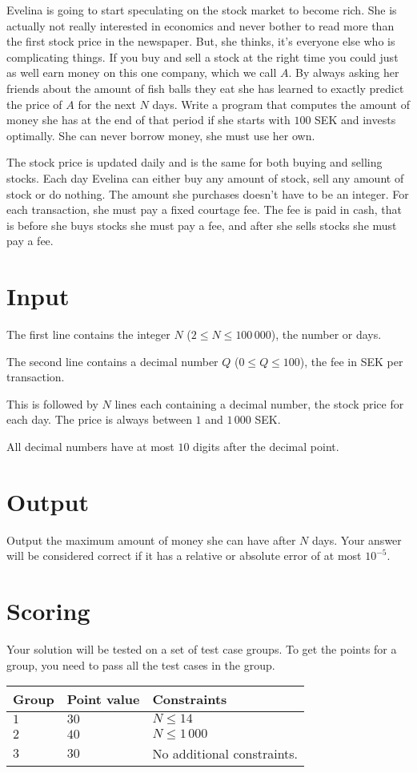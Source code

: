 Evelina is going to start speculating on the stock market to become rich.
She is actually not really interested in economics and never bother to read more than the first stock price in the newspaper.
But, she thinks, it's everyone else who is complicating things.
If you buy and sell a stock at the right time you could just as well earn money on this one company, which we call $A$.
By always asking her friends about the amount of fish balls they eat she has learned to exactly predict the price of $A$ for the next $N$ days.
Write a program that computes the amount of money she has at the end of that period if she starts with $100$ SEK and invests optimally.
She can never borrow money, she must use her own.

The stock price is updated daily and is the same for both buying and selling stocks.
Each day Evelina can either buy any amount of stock, sell any amount of stock or do nothing.
The amount she purchases doesn't have to be an integer.
For each transaction, she must pay a fixed courtage fee.
The fee is paid in cash, that is before she buys stocks she must pay a fee, and after she sells stocks she must pay a fee.

\section*{Input}
The first line contains the integer $N$ ($2 \le N \le 100\,000$), the number or days.

The second line contains a decimal number $Q$ ($0 \le Q \le 100$), the fee in SEK per transaction.

This is followed by $N$ lines each containing a decimal number, the stock price for each day.
The price is always between $1$ and $1\,000$ SEK.

All decimal numbers have at most $10$ digits after the decimal point.

\section*{Output}
Output the maximum amount of money she can have after $N$ days.
Your answer will be considered correct if it has a relative or absolute error of at most $10^{-5}$.

\section*{Scoring}
Your solution will be tested on a set of test case groups.
To get the points for a group, you need to pass all the test cases in the group.


\noindent
\begin{tabular}{| l | l | p{12cm} |}
  \hline
  \textbf{Group} & \textbf{Point value} & \textbf{Constraints} \\ \hline
  $1$    & $30$        & $N \le 14$ \\ \hline 
  $2$    & $40$        & $N \le 1\,000$ \\ \hline
  $3$    & $30$        & No additional constraints. \\ \hline
\end{tabular}

